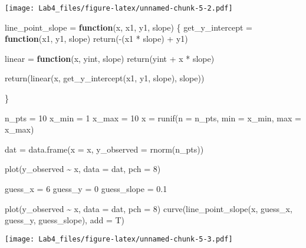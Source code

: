 \documentclass[
]{article}
\newenvironment{Shaded}{\begin{snugshade}}{\end{snugshade}}
\newcommand{\AttributeTok}[1]{\textcolor[rgb]{0.77,0.63,0.00}{#1}}
\newcommand{\ControlFlowTok}[1]{\textcolor[rgb]{0.13,0.29,0.53}{\textbf{#1}}}
\newcommand{\DecValTok}[1]{\textcolor[rgb]{0.00,0.00,0.81}{#1}}
\newcommand{\FloatTok}[1]{\textcolor[rgb]{0.00,0.00,0.81}{#1}}
\newcommand{\FunctionTok}[1]{\textcolor[rgb]{0.00,0.00,0.00}{#1}}
\newcommand{\NormalTok}[1]{#1}
\newcommand{\OtherTok}[1]{\textcolor[rgb]{0.56,0.35,0.01}{#1}}
\newcommand{\SpecialCharTok}[1]{\textcolor[rgb]{0.00,0.00,0.00}{#1}}
\begin{document}
\texttt{[image: Lab4\_files/figure-latex/unnamed-chunk-5-2.pdf]}

\begin{Shaded}
\begin{Highlighting}[]
\NormalTok{line\_point\_slope }\OtherTok{=} \ControlFlowTok{function}\NormalTok{(x, x1, y1, slope)}
\NormalTok{\{}
\NormalTok{  get\_y\_intercept }\OtherTok{=} 
    \ControlFlowTok{function}\NormalTok{(x1, y1, slope) }
      \FunctionTok{return}\NormalTok{(}\SpecialCharTok{{-}}\NormalTok{(x1 }\SpecialCharTok{*}\NormalTok{ slope) }\SpecialCharTok{+}\NormalTok{ y1)}
  
\NormalTok{  linear }\OtherTok{=} 
    \ControlFlowTok{function}\NormalTok{(x, yint, slope) }
      \FunctionTok{return}\NormalTok{(yint }\SpecialCharTok{+}\NormalTok{ x }\SpecialCharTok{*}\NormalTok{ slope)}
  
  \FunctionTok{return}\NormalTok{(}\FunctionTok{linear}\NormalTok{(x, }\FunctionTok{get\_y\_intercept}\NormalTok{(x1, y1, slope), slope))}
  
\NormalTok{\}}

\NormalTok{n\_pts }\OtherTok{=} \DecValTok{10}
\NormalTok{x\_min }\OtherTok{=} \DecValTok{1}
\NormalTok{x\_max }\OtherTok{=} \DecValTok{10}
\NormalTok{x }\OtherTok{=} \FunctionTok{runif}\NormalTok{(}\AttributeTok{n =}\NormalTok{ n\_pts, }\AttributeTok{min =}\NormalTok{ x\_min, }\AttributeTok{max =}\NormalTok{ x\_max)}

\NormalTok{dat }\OtherTok{=} \FunctionTok{data.frame}\NormalTok{(}\AttributeTok{x =}\NormalTok{ x, }\AttributeTok{y\_observed =} \FunctionTok{rnorm}\NormalTok{(n\_pts))}

\FunctionTok{plot}\NormalTok{(y\_observed }\SpecialCharTok{\textasciitilde{}}\NormalTok{ x, }\AttributeTok{data =}\NormalTok{ dat, }\AttributeTok{pch =} \DecValTok{8}\NormalTok{)}

\NormalTok{guess\_x }\OtherTok{=} \DecValTok{6}
\NormalTok{guess\_y }\OtherTok{=} \DecValTok{0}
\NormalTok{guess\_slope }\OtherTok{=} \FloatTok{0.1}

\FunctionTok{plot}\NormalTok{(y\_observed }\SpecialCharTok{\textasciitilde{}}\NormalTok{ x, }\AttributeTok{data =}\NormalTok{ dat, }\AttributeTok{pch =} \DecValTok{8}\NormalTok{)}
\FunctionTok{curve}\NormalTok{(}\FunctionTok{line\_point\_slope}\NormalTok{(x, guess\_x, guess\_y, guess\_slope), }\AttributeTok{add =}\NormalTok{ T)}
\end{Highlighting}
\end{Shaded}

\texttt{[image: Lab4\_files/figure-latex/unnamed-chunk-5-3.pdf]}
\end{document}
